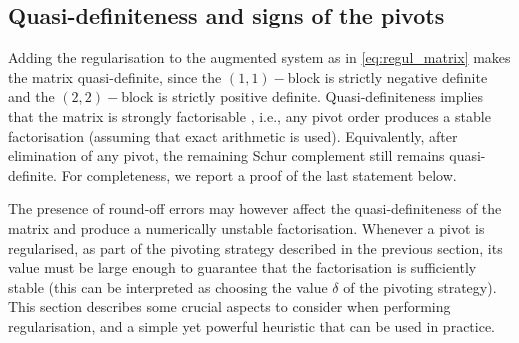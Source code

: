 \documentclass[a4paper]{article}
\newcommand{\0}{\mathbf 0}
\begin{document}
\subsection{Quasi-definiteness and signs of the pivots}
Adding the regularisation to the augmented system as in \eqref{eq:regul_matrix} makes the matrix quasi-definite, since the $(1,1)-$block is strictly negative definite and the $(2,2)-$block is strictly positive definite. Quasi-definiteness implies that the matrix is strongly factorisable \cite{Van:quasidefinite}, i.e., any pivot order produces a stable factorisation (assuming that exact arithmetic is used). Equivalently, after elimination of any pivot, the remaining Schur complement still remains quasi-definite. For completeness, we report a proof of the last statement below.

The presence of round-off errors may however affect the quasi-definiteness of the matrix and produce a numerically unstable factorisation. Whenever a pivot is regularised, as part of the pivoting strategy described in the previous section, its value must be large enough to guarantee that the factorisation is sufficiently stable (this can be interpreted as choosing the value $\delta$ of the pivoting strategy). This section describes some crucial aspects to consider when performing regularisation, and a simple yet powerful heuristic that can be used in practice.




\end{document}
